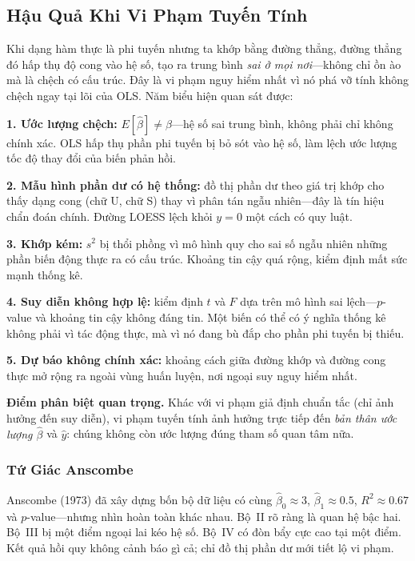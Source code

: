 \documentclass[12pt, a4paper]{article}
\begin{document}
\subsection{Hậu Quả Khi Vi Phạm Tuyến Tính}

Khi dạng hàm thực là phi tuyến nhưng ta khớp bằng đường thẳng, đường thẳng đó hấp thụ độ cong vào hệ số, tạo ra trung bình \textit{sai ở mọi nơi}---không chỉ ồn ào mà là chệch có cấu trúc. Đây là vi phạm nguy hiểm nhất vì nó phá vỡ tính không chệch ngay tại lõi của OLS. Năm biểu hiện quan sát được:

\textbf{1. Ước lượng chệch:} $E[\hat{\beta}] \neq \beta$---hệ số sai trung bình, không phải chỉ không chính xác. OLS hấp thụ phần phi tuyến bị bỏ sót vào hệ số, làm lệch ước lượng tốc độ thay đổi của biến phản hồi.

\textbf{2. Mẫu hình phần dư có hệ thống:} đồ thị phần dư theo giá trị khớp cho thấy dạng cong (chữ U, chữ S) thay vì phân tán ngẫu nhiên---đây là tín hiệu chẩn đoán chính. Đường LOESS lệch khỏi $y = 0$ một cách có quy luật.

\textbf{3. Khớp kém:} $s^2$ bị thổi phồng vì mô hình quy cho sai số ngẫu nhiên những phần biến động thực ra có cấu trúc. Khoảng tin cậy quá rộng, kiểm định mất sức mạnh thống kê.

\textbf{4. Suy diễn không hợp lệ:} kiểm định $t$ và $F$ dựa trên mô hình sai lệch---$p$-value và khoảng tin cậy không đáng tin. Một biến có thể có ý nghĩa thống kê không phải vì tác động thực, mà vì nó đang bù đắp cho phần phi tuyến bị thiếu.

\textbf{5. Dự báo không chính xác:} khoảng cách giữa đường khớp và đường cong thực mở rộng ra ngoài vùng huấn luyện, nơi ngoại suy nguy hiểm nhất.

\textbf{Điểm phân biệt quan trọng.} Khác với vi phạm giả định chuẩn tắc (chỉ ảnh hưởng đến suy diễn), vi phạm tuyến tính ảnh hưởng trực tiếp đến \textit{bản thân ước lượng $\hat{\beta}$} và $\hat{y}$: chúng không còn ước lượng đúng tham số quan tâm nữa.

\subsubsection{Tứ Giác Anscombe}

Anscombe (1973) đã xây dựng bốn bộ dữ liệu có cùng $\hat{\beta}_0 \approx 3$, $\hat{\beta}_1 \approx 0.5$, $R^2 \approx 0.67$ và $p$-value---nhưng nhìn hoàn toàn khác nhau. Bộ~II rõ ràng là quan hệ bậc hai. Bộ~III bị một điểm ngoại lai kéo hệ số. Bộ~IV có đòn bẩy cực cao tại một điểm. Kết quả hồi quy không cảnh báo gì cả; chỉ đồ thị phần dư mới tiết lộ vi phạm.
\end{document}
